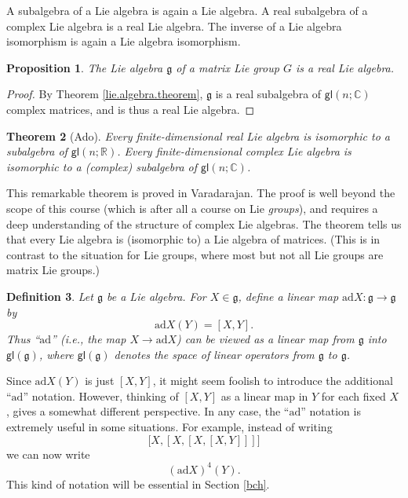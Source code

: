 \documentclass[12pt]{amsbook}
\let \frak = \mathfrak
\theoremstyle{plain}
\newtheorem{theorem}{Theorem}
\newtheorem{definition}[theorem]{Definition}
\newtheorem{proposition}[theorem]{Proposition}
\numberwithin{equation}{chapter}
\numberwithin{theorem}{chapter}
\begin{document}
A subalgebra of a Lie algebra is again a Lie algebra. A real subalgebra of a
complex Lie algebra is a real Lie algebra. The inverse of a Lie algebra
isomorphism is again a Lie algebra isomorphism.

\begin{proposition}
The Lie algebra $\frak{g}$ of a matrix Lie group $G$ is a real Lie algebra.
\end{proposition}

\begin{proof}
By Theorem \ref{lie.algebra.theorem}, $\frak{g}$ is a real subalgebra of
$\mathsf{gl}(n;\mathbb{C})$ complex matrices, and is thus a real Lie algebra.
\end{proof}

\begin{theorem}
[Ado]Every finite-dimensional real Lie algebra is isomorphic to a subalgebra
of $\mathsf{gl}(n;\mathbb{R})$. Every finite-dimensional complex Lie algebra
is isomorphic to a (complex) subalgebra of $\mathsf{gl}(n;\mathbb{C})$.
\end{theorem}

This remarkable theorem is proved in Varadarajan. The proof is well beyond the
scope of this course (which is after all a course on Lie \textit{groups}), and
requires a deep understanding of the structure of complex Lie algebras. The
theorem tells us that every Lie algebra is (isomorphic to) a Lie algebra of
matrices. (This is in contrast to the situation for Lie groups, where most but
not all Lie groups are matrix Lie groups.)

\begin{definition}
Let $\frak{g}$ be a Lie algebra. For $X\in\frak{g}$, define a linear map
$\mathrm{ad}X:\frak{g}\rightarrow\frak{g}$ by
\[
\mathrm{ad}X(Y)=[X,Y]\text{.}%
\]
Thus ``$\mathrm{ad}$'' (i.e., the map $X\rightarrow\mathrm{ad}X$) can be
viewed as a linear map from $\frak{g}$ into $\mathsf{gl}(\frak{g})$, where
$\mathsf{gl}(\frak{g})$ denotes the space of linear operators from $\frak{g}$
to $\frak{g}$.
\end{definition}

Since $\mathrm{ad}X(Y)$ is just $[X,Y]$, it might seem foolish to introduce
the additional ``$\mathrm{ad}$'' notation. However, thinking of $[X,Y]$ as a
linear map in $Y$ for each fixed $X$, gives a somewhat different perspective.
In any case, the ``$\mathrm{ad}$'' notation is extremely useful in some
situations. For example, instead of writing
\[
\lbrack X,[X,[X,[X,Y]]]]
\]
we can now write
\[
\left(  \mathrm{ad}X\right)  ^{4}(Y)\text{.}%
\]
This kind of notation will be essential in Section \ref{bch}.
\end{document}
